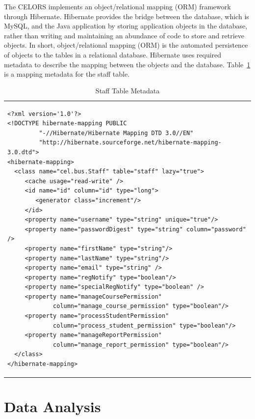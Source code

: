 
The CELORS implements an object/relational mapping (ORM) framework through Hibernate. Hibernate provides the bridge between the database, which is MySQL, and the Java application by storing application objects in the database, rather than writing and maintaining an abundance of code to store and retrieve objects. In short, object/relational mapping (ORM) is the automated persistence of objects to the tables in a relational database. Hibernate uses required metadata to describe the mapping between the objects and the database. Table~\ref{table:staff_metadata} is a mapping metadata for the staff table.

\vspace{3em}

\begin{table}[H]
\caption{Staff Table Metadata}\label{table:staff_metadata}
	\textbf{ }
\small
\begin{tabular}{p{13cm}}
\begin{verbatim}
<?xml version='1.0'?>
<!DOCTYPE hibernate-mapping PUBLIC 
         "-//Hibernate/Hibernate Mapping DTD 3.0//EN" 
         "http://hibernate.sourceforge.net/hibernate-mapping-3.0.dtd">
<hibernate-mapping>
  <class name="cel.bus.Staff" table="staff" lazy="true"> 
     <cache usage="read-write" />
     <id name="id" column="id" type="long">
        <generator class="increment"/>
     </id> 
     <property name="username" type="string" unique="true"/>
     <property name="passwordDigest" type="string" column="password" />
     <property name="firstName" type="string"/>
     <property name="lastName" type="string"/>
     <property name="email" type="string" />
     <property name="regNotify" type="boolean"/> 
     <property name="specialRegNotify" type="boolean" />
     <property name="manageCoursePermission" 
             column="manage_course_permission" type="boolean"/>
     <property name="processStudentPermission" 
             column="process_student_permission" type="boolean"/>
     <property name="manageReportPermission" 
             column="manage_report_permission" type="boolean"/>
  </class>
</hibernate-mapping>
\end{verbatim}
\end{tabular}
\end{table}

\section{Data Analysis}

